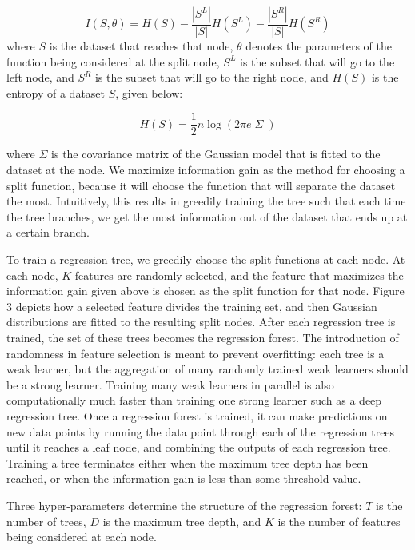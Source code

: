 \begin{equation}
  I(S,\theta) = H(S) - \frac{|S^L|}{|S|} H(S^L) - \frac{|S^R|}{|S|} H(S^R)
\end{equation}
where $S$ is the dataset that reaches that node, $\theta$ denotes the parameters of the function being considered at the split node, $S^L$ is the subset that will go to the left node, and $S^R$ is the subset that will go to the right node, and $H(S)$ is the entropy of a dataset $S$, given below:

\begin{equation}
  H(S) = \frac{1}{2} n \log(2\pi e  |\Sigma|)
\end{equation}

where $\Sigma$ is the covariance matrix of the Gaussian model that is fitted to the dataset at the node. We maximize information gain as the method for choosing a split function, because it will choose the function that will separate the dataset the most. Intuitively, this results in greedily training the tree such that each time the tree branches, we get the most information out of the dataset that ends up at a certain branch.

To train a regression tree, we greedily choose the split functions at each node. At each node, $K$ features are randomly selected, and the feature that maximizes the information gain given above is chosen as the split function for that node. Figure 3 depicts how a selected feature divides the training set, and then Gaussian distributions are fitted to the resulting split nodes. After each regression tree is trained, the set of these trees becomes the regression forest. The introduction of randomness in feature selection is meant to prevent overfitting: each tree is a weak learner, but the aggregation of many randomly trained weak learners should be a strong learner. Training many weak learners in parallel is also computationally much faster than training one strong learner such as a deep regression tree. Once a regression forest is trained, it can make predictions on new data points by running the data point through each of the regression trees until it reaches a leaf node, and combining the outputs of each regression tree. Training a tree terminates either when the maximum tree depth has been reached, or when the information gain is less than some threshold value.

Three hyper-parameters determine the structure of the regression forest: $T$ is the number of trees, $D$ is the maximum tree depth, and $K$ is the number of features being considered at each node.

